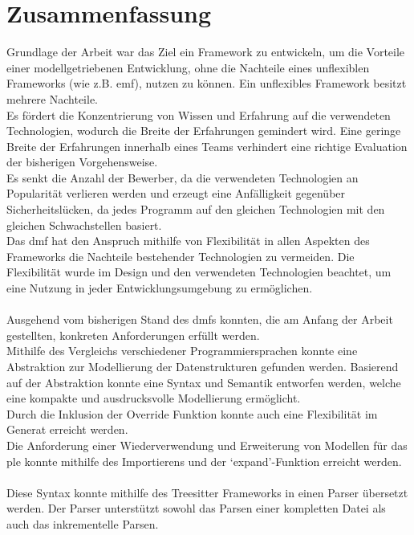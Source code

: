 \documentclass[./einleitung.tex]{subfiles}
\begin{document}
\chapter{Zusammenfassung}\label{ch:zusammenfassung}
Grundlage der Arbeit war das Ziel ein Framework zu entwickeln, um die Vorteile einer modellgetriebenen Entwicklung,
ohne die Nachteile eines unflexiblen Frameworks (wie z.B. \acrshort{emf}), nutzen zu können.
Ein unflexibles Framework besitzt mehrere Nachteile.\\
Es fördert die Konzentrierung von Wissen und Erfahrung auf die verwendeten Technologien, wodurch die Breite der Erfahrungen gemindert wird.
Eine geringe Breite der Erfahrungen innerhalb eines Teams verhindert eine richtige Evaluation der bisherigen Vorgehensweise.\\
Es senkt die Anzahl der Bewerber, da die verwendeten Technologien an Popularität verlieren werden und erzeugt eine Anfälligkeit gegenüber Sicherheitslücken,
da jedes Programm auf den gleichen Technologien mit den gleichen Schwachstellen basiert.\\
Das \acrshort{dmf} hat den Anspruch mithilfe von Flexibilität in allen Aspekten des Frameworks die Nachteile bestehender Technologien zu vermeiden.
Die Flexibilität wurde im Design und den verwendeten Technologien beachtet, um eine Nutzung in jeder Entwicklungsumgebung zu ermöglichen.
\\\\
Ausgehend vom bisherigen Stand des \acrshort{dmf}s konnten, die am Anfang der Arbeit gestellten, konkreten Anforderungen erfüllt werden.\\
Mithilfe des Vergleichs verschiedener Programmiersprachen konnte eine Abstraktion zur Modellierung der Datenstrukturen gefunden werden.
Basierend auf der Abstraktion konnte eine Syntax und Semantik entworfen werden, welche eine kompakte und ausdrucksvolle Modellierung ermöglicht.\\
Durch die Inklusion der Override Funktion konnte auch eine Flexibilität im Generat erreicht werden.\\
Die Anforderung einer Wiederverwendung und Erweiterung von Modellen für das \acrshort{ple} konnte mithilfe des Importierens und der `expand'-Funktion erreicht werden.
\\\\
Diese Syntax konnte mithilfe des Treesitter Frameworks in einen Parser übersetzt werden.
Der Parser unterstützt sowohl das Parsen einer kompletten Datei als auch das inkrementelle Parsen.\\
\end{document}
